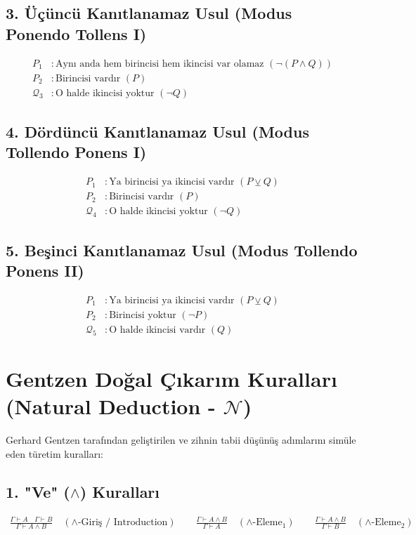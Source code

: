 \documentclass[11pt, a4paper]{article}
\begin{document}
\subsection{3. Üçüncü Kanıtlanamaz Usul (Modus Ponendo Tollens I)}
\begin{align}
P_1 &: \text{Aynı anda hem birincisi hem ikincisi var olamaz } (\neg(P \land Q)) \\
P_2 &: \text{Birincisi vardır } (P) \\
\mathcal{Q}_{3} &: \text{O halde ikincisi yoktur } (\neg Q)
\end{align}

\subsection{4. Dördüncü Kanıtlanamaz Usul (Modus Tollendo Ponens I)}
\begin{align}
P_1 &: \text{Ya birincisi ya ikincisi vardır } (P \veebar Q) \\
P_2 &: \text{Birincisi vardır } (P) \\
\mathcal{Q}_{4} &: \text{O halde ikincisi yoktur } (\neg Q)
\end{align}

\subsection{5. Beşinci Kanıtlanamaz Usul (Modus Tollendo Ponens II)}
\begin{align}
P_1 &: \text{Ya birincisi ya ikincisi vardır } (P \veebar Q) \\
P_2 &: \text{Birincisi yoktur } (\neg P) \\
\mathcal{Q}_{5} &: \text{O halde ikincisi vardır } (Q)
\end{align}

\section{Gentzen Doğal Çıkarım Kuralları (Natural Deduction - $\mathcal{N}$)}

Gerhard Gentzen tarafından geliştirilen ve zihnin tabii düşünüş adımlarını simüle eden türetim kuralları:

\subsection{1. "Ve" ($\land$) Kuralları}
\begin{align}
\frac{\Gamma \vdash A \quad \Gamma \vdash B}{\Gamma \vdash A \land B} \quad (\land\text{-Giriş / Introduction}) \qquad
\frac{\Gamma \vdash A \land B}{\Gamma \vdash A} \quad (\land\text{-Eleme}_1) \qquad
\frac{\Gamma \vdash A \land B}{\Gamma \vdash B} \quad (\land\text{-Eleme}_2)
\end{align}
\end{document}
